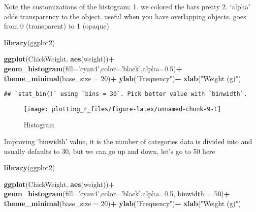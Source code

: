 \documentclass[
]{book}
\newenvironment{Shaded}{\begin{snugshade}}{\end{snugshade}}
\newcommand{\DataTypeTok}[1]{\textcolor[rgb]{0.13,0.29,0.53}{#1}}
\newcommand{\DecValTok}[1]{\textcolor[rgb]{0.00,0.00,0.81}{#1}}
\newcommand{\FloatTok}[1]{\textcolor[rgb]{0.00,0.00,0.81}{#1}}
\newcommand{\KeywordTok}[1]{\textcolor[rgb]{0.13,0.29,0.53}{\textbf{#1}}}
\newcommand{\NormalTok}[1]{#1}
\newcommand{\OperatorTok}[1]{\textcolor[rgb]{0.81,0.36,0.00}{\textbf{#1}}}
\newcommand{\StringTok}[1]{\textcolor[rgb]{0.31,0.60,0.02}{#1}}
\begin{document}
Note the customizations of the histogram:
1. we colored the bars pretty
2. `alpha' adds transparency to the object, useful when you have overlapping objects, goes from 0 (transparent) to 1 (opaque)

\begin{Shaded}
\begin{Highlighting}[]
\KeywordTok{library}\NormalTok{(ggplot2)}

\KeywordTok{ggplot}\NormalTok{(ChickWeight, }\KeywordTok{aes}\NormalTok{(weight))}\OperatorTok{+}
\StringTok{  }\KeywordTok{geom_histogram}\NormalTok{(}\DataTypeTok{fill=}\StringTok{'cyan4'}\NormalTok{,}\DataTypeTok{color=}\StringTok{'black'}\NormalTok{,}\DataTypeTok{alpha=}\FloatTok{0.5}\NormalTok{)}\OperatorTok{+}
\StringTok{  }\KeywordTok{theme_minimal}\NormalTok{(}\DataTypeTok{base_size =} \DecValTok{20}\NormalTok{)}\OperatorTok{+}
\StringTok{  }\KeywordTok{ylab}\NormalTok{(}\StringTok{"Frequency"}\NormalTok{)}\OperatorTok{+}\StringTok{ }\KeywordTok{xlab}\NormalTok{(}\StringTok{"Weight (g)"}\NormalTok{)}
\end{Highlighting}
\end{Shaded}

\begin{verbatim}
## `stat_bin()` using `bins = 30`. Pick better value with `binwidth`.
\end{verbatim}

\begin{figure}

{\centering \texttt{[image: plotting\_r\_files/figure-latex/unnamed-chunk-9-1]} 

}

\caption{Histogram}\label{fig:unnamed-chunk-9}
\end{figure}

Improving `binwidth' value, it is the number of categories data is divided into and usually defaults to 30, but we can go up and down, let's go to 50 here

\begin{Shaded}
\begin{Highlighting}[]
\KeywordTok{library}\NormalTok{(ggplot2)}

\KeywordTok{ggplot}\NormalTok{(ChickWeight, }\KeywordTok{aes}\NormalTok{(weight))}\OperatorTok{+}
\StringTok{  }\KeywordTok{geom_histogram}\NormalTok{(}\DataTypeTok{fill=}\StringTok{'cyan4'}\NormalTok{,}\DataTypeTok{color=}\StringTok{'black'}\NormalTok{,}\DataTypeTok{alpha=}\FloatTok{0.5}\NormalTok{, }\DataTypeTok{binwidth =} \DecValTok{50}\NormalTok{)}\OperatorTok{+}
\StringTok{  }\KeywordTok{theme_minimal}\NormalTok{(}\DataTypeTok{base_size =} \DecValTok{20}\NormalTok{)}\OperatorTok{+}
\StringTok{  }\KeywordTok{ylab}\NormalTok{(}\StringTok{"Frequency"}\NormalTok{)}\OperatorTok{+}\StringTok{ }\KeywordTok{xlab}\NormalTok{(}\StringTok{"Weight (g)"}\NormalTok{)}
\end{Highlighting}
\end{Shaded}
\end{document}
